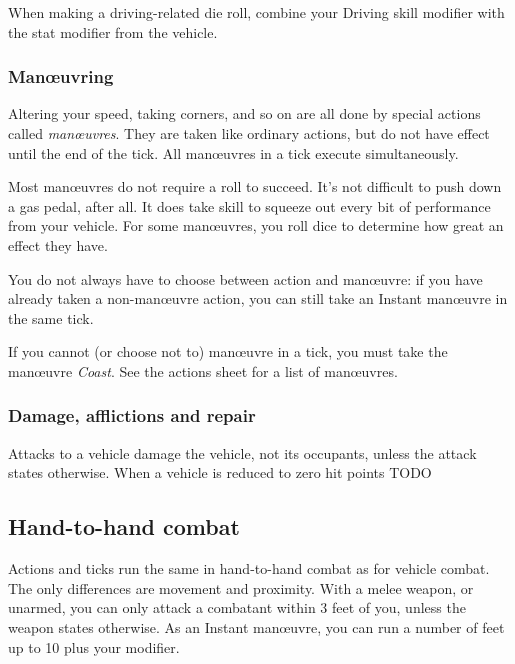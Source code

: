 \documentclass[10pt, a4paper, twocolumn]{article}
\begin{document}
When making a driving-related die roll, combine your Driving skill modifier with
the stat modifier from the vehicle.

\subsubsection{Man\oe{}uvring}
Altering your speed, taking corners, and so on are all done by special actions
called \emph{man\oe{}uvres}. They are taken like ordinary actions, but do not
have effect until the end of the tick. All man\oe{}uvres in a tick execute
simultaneously. 

Most man\oe{}uvres do not require a roll to succeed. It's not difficult to push
down a gas pedal, after all. It does take skill to squeeze out every bit of
performance from your vehicle. For some man\oe{}uvres, you roll dice to
determine how great an effect they have.

You do not always have to choose between action and man\oe{}uvre: if you have
already taken a non-man\oe{}uvre action, you can still take an Instant
man\oe{}uvre in the same tick.

If you cannot (or choose not to) man\oe{}uvre in a tick, you must take the
man\oe{}uvre \emph{Coast}. See the actions sheet for a list of man\oe{}uvres.

\subsubsection{Damage, afflictions and repair}
Attacks to a vehicle damage the vehicle, not its occupants, unless the attack
states otherwise. When a vehicle is reduced to zero hit points TODO

\subsection{Hand-to-hand combat}

Actions and ticks run the same in hand-to-hand combat as for vehicle combat. The only
differences are movement and proximity. With a melee weapon, or unarmed, you can
only attack a combatant within 3 feet of you, unless the weapon states
otherwise. As an Instant man\oe{}uvre, you can run a number of feet up to 10
plus your  modifier. 
\end{document}
